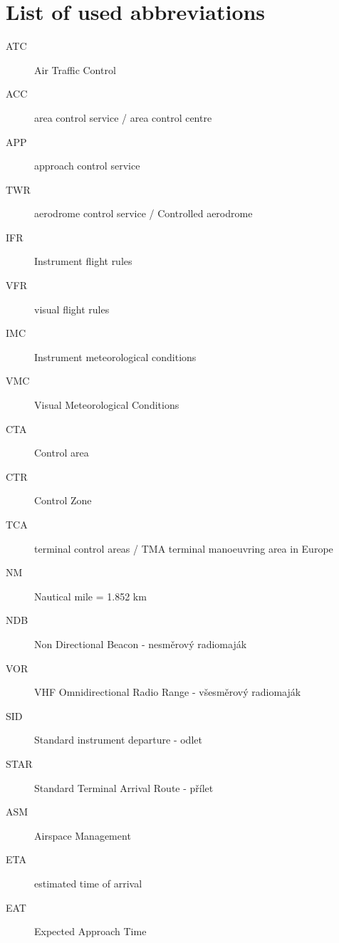 \chapter{List of used abbreviations}

\begin{description}
\item[ATC] Air Traffic Control
\item[ACC] area control service / area control centre
\item[APP] approach control service
\item[TWR] aerodrome control service / Controlled aerodrome
\item[IFR] Instrument flight rules
\item[VFR] visual flight rules
\item[IMC] Instrument meteorological conditions
\item[VMC] Visual Meteorological Conditions
\item[CTA] Control area
\item[CTR] Control Zone
\item[TCA] terminal control areas / TMA terminal manoeuvring area in Europe
\item[NM] Nautical mile = 1.852 km
\item[NDB] Non Directional Beacon - nesměrový radiomaják
\item[VOR] VHF Omnidirectional Radio Range - všesměrový radiomaják
\item[SID] Standard instrument departure - odlet
\item[STAR] Standard Terminal Arrival Route - přílet
\item[ASM] Airspace Management
\item[ETA] estimated time of arrival
\item[EAT] Expected Approach Time
\end{description}